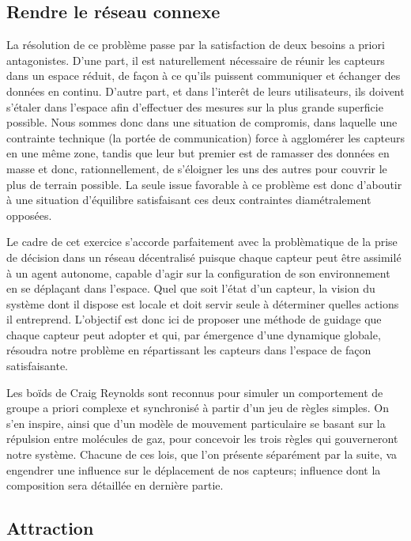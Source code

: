 \documentclass[10pt]{article}
\begin{document}
\begin{multicols}{2}
\section{Rendre le réseau connexe}

La résolution de ce problème passe par la satisfaction de deux besoins
a priori antagonistes. D'une part, il est naturellement nécessaire de
réunir les capteurs dans un espace réduit, de façon à ce qu'ils
puissent communiquer et échanger des données en continu. D'autre part,
et dans l'interêt de leurs utilisateurs, ils doivent s'étaler dans
l'espace afin d'effectuer des mesures sur la plus grande superficie
possible. Nous sommes donc dans une situation de compromis, dans
laquelle une contrainte technique (la portée de communication) force à
agglomérer les capteurs en une même zone, tandis que leur but premier
est de ramasser des données en masse et donc, rationnellement, de
s'éloigner les uns des autres pour couvrir le plus de terrain
possible. La seule issue favorable à ce problème est donc d'aboutir à
une situation d'équilibre satisfaisant ces deux contraintes
diamétralement opposées.

Le cadre de cet exercice s'accorde parfaitement avec la problèmatique
de la prise de décision dans un réseau décentralisé puisque chaque
capteur peut être assimilé à un agent autonome, capable d'agir sur la
configuration de son environnement en se déplaçant dans l'espace. Quel
que soit l'état d'un capteur, la vision du système dont il dispose est
locale et doit servir seule à déterminer quelles actions il
entreprend. L'objectif est donc ici de proposer une méthode de guidage
que chaque capteur peut adopter et qui, par émergence d'une dynamique
globale, résoudra notre problème en répartissant les capteurs dans
l'espace de façon satisfaisante.

Les boïds de Craig Reynolds \cite{Reynolds1987} sont reconnus pour
simuler un comportement de groupe a priori complexe et synchronisé à
partir d'un jeu de règles simples. On s'en inspire, ainsi que d'un
modèle de mouvement particulaire \cite{Cheng2011497} se basant sur la
répulsion entre molécules de gaz, pour concevoir les trois règles qui
gouverneront notre système. Chacune de ces lois, que l'on présente
séparément par la suite, va engendrer une influence sur le déplacement
de nos capteurs; influence dont la composition sera détaillée en
dernière partie.

\subsection{Attraction}


\end{multicols}
\end{document}

